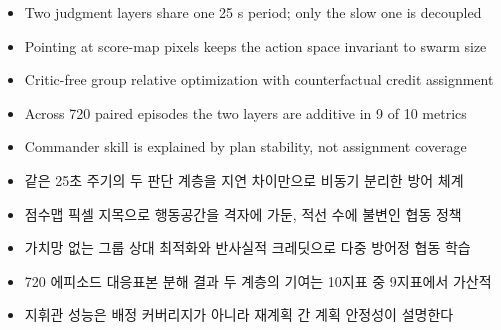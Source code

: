 \documentclass[11pt]{article}
\begin{document}

\vspace{4pt}
\begin{itemize}[leftmargin=1.2em, itemsep=3pt, topsep=4pt]
\item Two judgment layers share one 25 s period; only the slow one is decoupled
\item Pointing at score-map pixels keeps the action space invariant to swarm size
\item Critic-free group relative optimization with counterfactual credit assignment
\item Across 720 paired episodes the two layers are additive in 9 of 10 metrics
\item Commander skill is explained by plan stability, not assignment coverage
\end{itemize}

\vspace{18pt}

\vspace{4pt}
\begin{itemize}[leftmargin=1.2em, itemsep=3pt, topsep=4pt]
\item 같은 25초 주기의 두 판단 계층을 지연 차이만으로 비동기 분리한 방어 체계
\item 점수맵 픽셀 지목으로 행동공간을 격자에 가둔, 적선 수에 불변인 협동 정책
\item 가치망 없는 그룹 상대 최적화와 반사실적 크레딧으로 다중 방어정 협동 학습
\item 720 에피소드 대응표본 분해 결과 두 계층의 기여는 10지표 중 9지표에서 가산적
\item 지휘관 성능은 배정 커버리지가 아니라 재계획 간 계획 안정성이 설명한다
\end{itemize}
\end{document}
